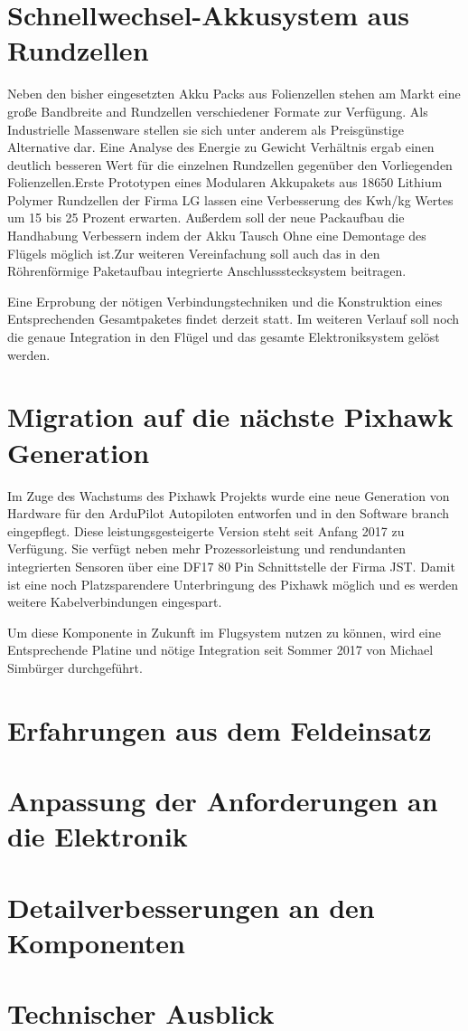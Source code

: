 \section{Schnellwechsel-Akkusystem aus Rundzellen}

Neben den bisher eingesetzten Akku Packs aus Folienzellen stehen am Markt eine große Bandbreite and Rundzellen verschiedener Formate zur Verfügung. Als Industrielle Massenware stellen sie sich unter anderem als Preisgünstige Alternative dar.
Eine Analyse des Energie zu Gewicht Verhältnis ergab einen deutlich besseren Wert für die einzelnen Rundzellen gegenüber den Vorliegenden Folienzellen.Erste Prototypen eines Modularen Akkupakets aus 18650 Lithium Polymer Rundzellen der Firma LG lassen eine Verbesserung des Kwh/kg Wertes um 15 bis 25 Prozent erwarten.
Außerdem soll der neue Packaufbau die Handhabung Verbessern indem der Akku Tausch Ohne eine Demontage des Flügels möglich ist.Zur weiteren Vereinfachung soll auch das in den Röhrenförmige Paketaufbau integrierte Anschlussstecksystem beitragen.

Eine Erprobung der nötigen Verbindungstechniken und die Konstruktion eines Entsprechenden Gesamtpaketes findet derzeit statt.
Im weiteren Verlauf soll noch die genaue Integration in den Flügel und das gesamte Elektroniksystem gelöst werden.

\section{Migration auf die nächste Pixhawk Generation}

Im Zuge des Wachstums des Pixhawk Projekts wurde eine neue Generation von Hardware für den ArduPilot Autopiloten entworfen und in den Software branch eingepflegt. Diese leistungsgesteigerte Version steht seit Anfang 2017 zu Verfügung.
Sie verfügt neben mehr Prozessorleistung und rendundanten integrierten Sensoren über eine DF17 80 Pin Schnittstelle der Firma JST. Damit ist eine noch Platzsparendere Unterbringung des Pixhawk möglich und es werden weitere Kabelverbindungen eingespart.

Um diese Komponente in Zukunft im Flugsystem nutzen zu können, wird eine Entsprechende Platine und nötige Integration seit Sommer 2017 von Michael Simbürger durchgeführt.

\section{Erfahrungen aus dem Feldeinsatz}

\section{Anpassung der Anforderungen an die Elektronik}

\section{Detailverbesserungen an den Komponenten}

\section{Technischer Ausblick}